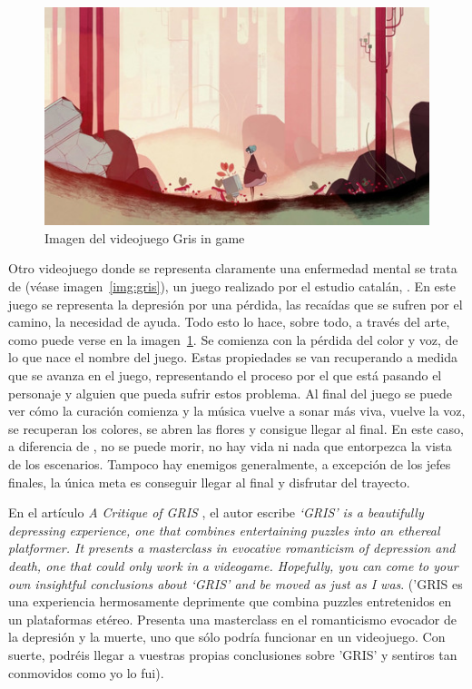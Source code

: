 \documentclass[12pt, a4paper,twoside,titlepage]{book}
\begin{document}
\begin{figure}
	\centering
	\includegraphics[width=.8\linewidth]{Imagenes videojuegos/gris2.jpg}
	\caption{Imagen del videojuego Gris in game}
	\label{img:gris2}
\end{figure}

Otro videojuego donde se representa claramente una enfermedad mental se trata de  (véase imagen~\ref{img:gris}), un juego realizado por el estudio catalán, \cite{nomadaStudio}. En este juego se representa la depresión por una pérdida, las recaídas que se sufren por el camino, la necesidad de ayuda. Todo esto lo hace, sobre todo, a través del arte, como puede verse en la imagen~\ref{img:gris2}. Se comienza con la pérdida del color y voz, de lo que nace el nombre del juego. Estas propiedades se van recuperando a medida que se avanza en el juego, representando el proceso por el que está pasando el personaje y alguien que pueda sufrir estos problema. Al final del juego se puede ver cómo la curación comienza y la música vuelve a sonar más viva, vuelve la voz, se recuperan los colores, se abren las flores y consigue llegar al final. En este caso, a diferencia de , no se puede morir, no hay vida ni nada que entorpezca la vista de los escenarios. Tampoco hay enemigos generalmente, a excepción de los jefes finales, la única meta es conseguir llegar al final y disfrutar del trayecto. 



En el artículo \textit{A Critique of GRIS} \cite{critiquegris}, el autor escribe \textit{ ‘GRIS’ is a beautifully depressing experience, one that combines entertaining puzzles into an ethereal platformer. It presents a masterclass in evocative romanticism of depression and death, one that could only work in a videogame. Hopefully, you can come to your own insightful conclusions about ‘GRIS’ and be moved as just as I was}. ('GRIS es una experiencia hermosamente deprimente que combina puzzles entretenidos en un plataformas etéreo. Presenta una masterclass en el romanticismo evocador de la depresión y la muerte, uno que sólo podría funcionar en un videojuego. Con suerte, podréis llegar a vuestras propias conclusiones sobre 'GRIS' y sentiros tan conmovidos como yo lo fui). 
\end{document}
